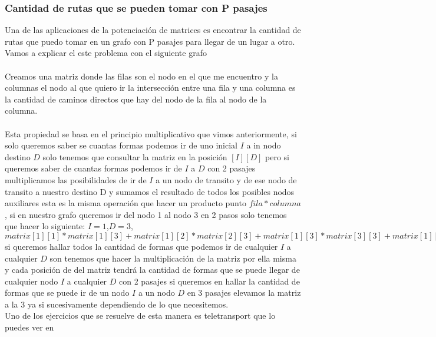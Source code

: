 \subsubsection{Cantidad de rutas que se pueden tomar con P pasajes}
Una de las aplicaciones de la potenciación de matrices es encontrar la cantidad de rutas que puedo
tomar en un grafo con P pasajes para llegar de un lugar a otro.
Vamos a explicar el este problema con el siguiente grafo
\\
\\Creamos una matriz donde las filas son el nodo en el que me encuentro y la columnas el nodo al que quiero ir la intersección entre una fila y una columna es la cantidad de caminos directos que hay del nodo de la fila al nodo de la columna.
\\
\\Esta propiedad se basa en el principio multiplicativo que vimos anteriormente, si solo queremos saber se cuantas formas podemos ir de uno inicial $I$ a in nodo destino $D$ solo tenemos que consultar la matriz en la posición $[I][D]$ pero si queremos saber de cuantas formas podemos ir de $I$ a $D$ con 2 pasajes multiplicamos las posibilidades de ir de $I$ a un nodo de transito y de ese nodo de transito a nuestro destino D y sumamos el resultado de todos los posibles nodos auxiliares esta es la misma operación que hacer un producto punto $fila * columna$, si en nuestro grafo queremos ir del nodo 1 al nodo 3 en 2 pasos solo tenemos que hacer lo siguiente:
$I=1$,$D=3$, $matrix[1][1]*matrix[1][3]+matrix[1][2]*matrix[2][3]+matrix[1][3]*matrix[3][3]+matrix[1][4]*matrix[4][3]+matrix[1][5]*matrix[5][3$
si queremos hallar todos la cantidad de formas que podemos ir de cualquier $I$ a cualquier $D$ son tenemos que hacer la multiplicación  de la matriz por ella misma y cada posición de del matriz tendrá la cantidad de formas que se puede llegar de cualquier nodo $I$ a cualquier $D$ con 2 pasajes
si queremos en hallar la cantidad de formas que se puede ir de un nodo $I$ a un nodo $D$ en 3 pasajes elevamos la matriz a la 3 ya si sucesivamente dependiendo de lo que necesitemos.
\\Uno de los ejercicios que se resuelve de esta manera es teletransport que lo puedes ver en \cite{Teletransport:Online}
